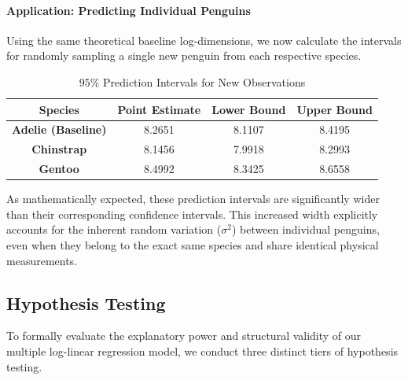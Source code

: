 \documentclass[12pt]{article}
\begin{document}
\paragraph{Application: Predicting Individual Penguins}
Using the same theoretical baseline log-dimensions, we now
calculate the intervals for randomly sampling a single new
penguin from each respective species.

\begin{table}[H]
  \centering
  \begin{tabular}{|| c | c | c c ||}
    \hline
    \textbf{Species}
    & \textbf{Point Estimate}
    & \textbf{Lower Bound}
    & \textbf{Upper Bound} \\
    \hline\hline
    \textbf{Adelie (Baseline)} & 8.2651 & 8.1107 & 8.4195 \\
    \textbf{Chinstrap} & 8.1456 & 7.9918 & 8.2993 \\
    \textbf{Gentoo} & 8.4992 & 8.3425 & 8.6558 \\
    \hline
  \end{tabular}
  \caption{$95\%$ Prediction Intervals for New Observations}
\end{table}

As mathematically expected, these prediction intervals are
significantly wider than their corresponding confidence
intervals. This increased width explicitly accounts for the
inherent random variation ($\sigma^2$) between individual
penguins, even when they belong to the exact same species
and share identical physical measurements.

\subsection{Hypothesis Testing}
To formally evaluate the explanatory power and structural
validity of our multiple log-linear regression model, we
conduct three distinct tiers of hypothesis testing.
\end{document}

